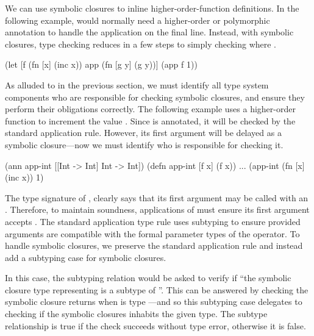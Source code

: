 We can use symbolic closures to inline higher-order-function definitions.
In the following example,  would normally need a higher-order
or polymorphic
annotation to handle the application on the final line.
Instead, with symbolic closures, type checking reduces in a few steps to simply checking
 where .

\begin{cljlisting}
(let [f (fn [x] (inc x))
      app (fn [g y] (g y))]
  (app f 1))
\end{cljlisting}

As alluded to in the previous section, we must identify
all type system components who are responsible for checking symbolic closures,
and ensure they perform their obligations correctly.
The following example uses a higher-order function
 to increment the value .
Since  is annotated, it will be checked
by the standard application rule.
However, its first argument will be delayed as a symbolic
closure---now we must identify who is responsible for checking it.

\begin{cljlisting}
(ann app-int [[Int -> Int] Int -> Int])
(defn app-int [f x] (f x))
...
(app-int (fn [x] (inc x)) 1)
\end{cljlisting}

The type signature of ,
clearly says that its first argument may be called with an .
Therefore, to maintain soundness, applications of 
must ensure its first argument accepts .
The standard application type rule uses subtyping to ensure
provided arguments are compatible with the formal parameter types of
the operator.
To handle symbolic closures, we preserve the standard application rule
and instead add a subtyping case for symbolic closures.

In this case, the subtyping relation would be asked to verify if
``the symbolic closure type representing 
is a subtype of ''.
This can be answered by checking the symbolic closure
returns  when 
 is type ---and so this subtyping case
delegates to checking if the symbolic closures inhabits the given type.
The subtype relationship is true if the check succeeds without type error,
otherwise it is false.

